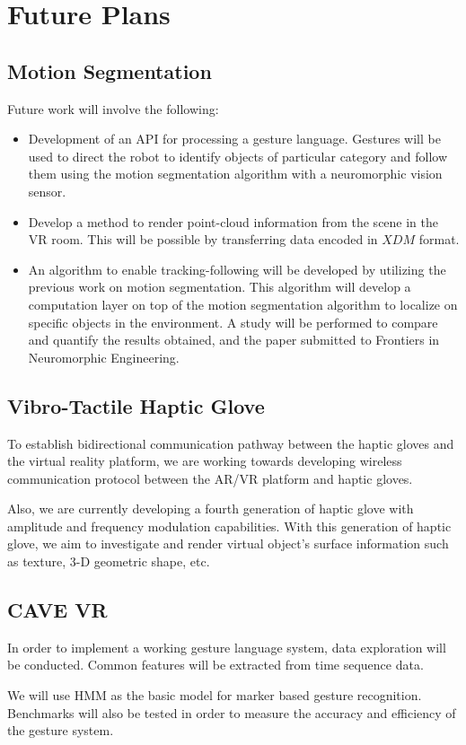 \chapter{Future Plans}
\section{Motion Segmentation }
Future work will involve the following:
\begin{itemize}
\item Development of an API for processing a gesture language. Gestures will be used to direct the robot to identify objects of particular category and follow them using the motion segmentation algorithm with a neuromorphic vision sensor.
  
\item Develop a method to render point-cloud information from the scene in the VR room. This will be possible by transferring data encoded in $XDM$ format.
	
\item An algorithm to enable tracking-following will be developed by utilizing the previous work on motion segmentation. This algorithm will develop a computation layer on top of the motion segmentation algorithm to localize on specific objects in the environment. A study will be performed to compare and quantify the results obtained, and the paper submitted to Frontiers in Neuromorphic Engineering. 
\end{itemize}

\section{Vibro-Tactile Haptic Glove}
To establish bidirectional communication pathway between the haptic
gloves and the virtual reality platform, we are working towards
developing wireless communication protocol between the AR/VR platform
and haptic gloves.

Also, we are currently developing a fourth generation of haptic glove with amplitude and frequency modulation capabilities. With this generation of haptic glove, we aim to investigate and render virtual object’s surface information such as texture, 3-D geometric shape, etc.  


\section{CAVE VR}
In order to implement a working gesture language system, data
exploration will be conducted. Common features will be extracted from
time sequence data.

We will use HMM as the basic model for marker based gesture
recognition. Benchmarks will also be tested in order to measure the
accuracy and efficiency of the gesture system.


